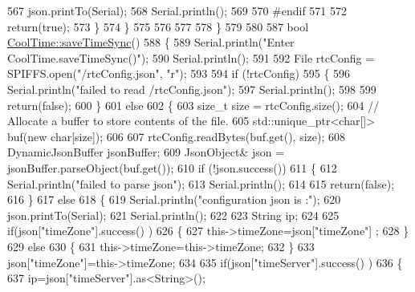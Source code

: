 \begin{DoxyCode}
567             json.printTo(Serial);
568             Serial.println();
569         
570 \textcolor{preprocessor}{        #endif}
571         
572             \textcolor{keywordflow}{return}(\textcolor{keyword}{true}); 
573         \}
574     \}   
575 
576 
577 
578 \}
579 
580 
587 \textcolor{keywordtype}{bool} \hyperlink{classCoolTime_ae9658c9b377510d469e3b88edf33ee85}{CoolTime::saveTimeSync}()
588 \{
589     Serial.println(\textcolor{stringliteral}{"Enter CoolTime.saveTimeSync()"});
590     Serial.println();
591 
592     File rtcConfig = SPIFFS.open(\textcolor{stringliteral}{"/rtcConfig.json"}, \textcolor{stringliteral}{"r"});
593 
594     \textcolor{keywordflow}{if} (!rtcConfig) 
595     \{
596         Serial.println(\textcolor{stringliteral}{"failed to read /rtcConfig.json"});
597         Serial.println();
598 
599         \textcolor{keywordflow}{return}(\textcolor{keyword}{false});
600     \}
601     \textcolor{keywordflow}{else}
602     \{
603         \textcolor{keywordtype}{size\_t} size = rtcConfig.size();
604         \textcolor{comment}{// Allocate a buffer to store contents of the file.}
605         std::unique\_ptr<char[]> buf(\textcolor{keyword}{new} \textcolor{keywordtype}{char}[size]);
606 
607         rtcConfig.readBytes(buf.get(), size);
608         DynamicJsonBuffer jsonBuffer;
609         JsonObject& json = jsonBuffer.parseObject(buf.get());
610         \textcolor{keywordflow}{if} (!json.success()) 
611         \{
612             Serial.println(\textcolor{stringliteral}{"failed to parse json"});
613             Serial.println();
614 
615             \textcolor{keywordflow}{return}(\textcolor{keyword}{false});
616         \} 
617         \textcolor{keywordflow}{else}
618         \{   
619             Serial.println(\textcolor{stringliteral}{"configuration json is :"});
620             json.printTo(Serial);
621             Serial.println();
622 
623             String ip;
624             
625             \textcolor{keywordflow}{if}(json[\textcolor{stringliteral}{"timeZone"}].success() )
626             \{
627                 this->timeZone=json[\textcolor{stringliteral}{"timeZone"}] ;
628             \}
629             \textcolor{keywordflow}{else}
630             \{
631                 this->timeZone=this->timeZone;          
632             \}
633             json[\textcolor{stringliteral}{"timeZone"}]=this->timeZone;
634             
635             \textcolor{keywordflow}{if}(json[\textcolor{stringliteral}{"timeServer"}].success() )
636             \{           
637                  ip=json[\textcolor{stringliteral}{"timeServer"}].as<String>();

\end{DoxyCode}
